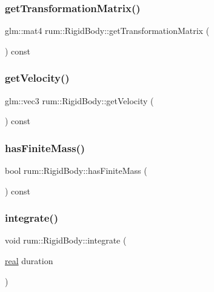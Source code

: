 \subsubsection{\texorpdfstring{get\+Transformation\+Matrix()}{getTransformationMatrix()}}
{\footnotesize\ttfamily glm\+::mat4 rum\+::\+Rigid\+Body\+::get\+Transformation\+Matrix (\begin{DoxyParamCaption}{ }\end{DoxyParamCaption}) const}

\mbox{\label{classrum_1_1_rigid_body_a4e321b456c54e8090e1c897d513829f9}} 
\subsubsection{\texorpdfstring{get\+Velocity()}{getVelocity()}}
{\footnotesize\ttfamily glm\+::vec3 rum\+::\+Rigid\+Body\+::get\+Velocity (\begin{DoxyParamCaption}{ }\end{DoxyParamCaption}) const}

\mbox{\label{classrum_1_1_rigid_body_a2f9a0176ad97d72081fce6f9724e52ea}} 
\subsubsection{\texorpdfstring{has\+Finite\+Mass()}{hasFiniteMass()}}
{\footnotesize\ttfamily bool rum\+::\+Rigid\+Body\+::has\+Finite\+Mass (\begin{DoxyParamCaption}{ }\end{DoxyParamCaption}) const}

\mbox{\label{classrum_1_1_rigid_body_a3f9e7cf532fc67b639b489a3875b08fd}} 
\subsubsection{\texorpdfstring{integrate()}{integrate()}}
{\footnotesize\ttfamily void rum\+::\+Rigid\+Body\+::integrate (\begin{DoxyParamCaption}\item[{\mbox{\hyperlink{namespacerum_a7e8cca23573d5eaead0f138cbaa4862c}{real}}}]{duration }\end{DoxyParamCaption})\hspace{0.3cm}{\ttfamily [virtual]}}


